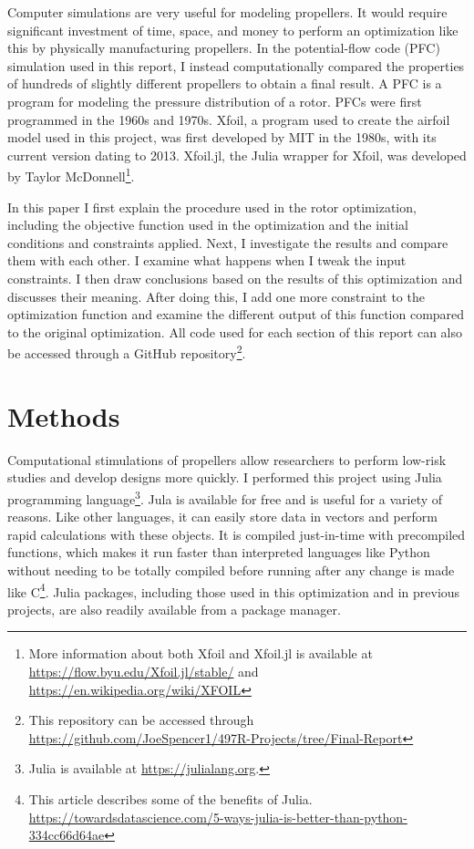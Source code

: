 \documentclass[journal ]{new-aiaa}
\begin{document}
Computer simulations are very useful for modeling propellers. It would require significant investment of time, space, and money to perform an optimization like this by physically manufacturing propellers. In the potential-flow code (PFC) simulation used in this report, I instead computationally compared the properties of hundreds of slightly different propellers to obtain a final result. A PFC is a program for modeling the pressure distribution of a rotor. PFCs were first programmed in the 1960s and 1970s. Xfoil, a program used to create the airfoil model used in this project, was first developed by MIT in the 1980s, with its current version dating to 2013. Xfoil.jl, the Julia wrapper for Xfoil, was developed by Taylor McDonnell\footnote{More information about both Xfoil and Xfoil.jl is available at \url{https://flow.byu.edu/Xfoil.jl/stable/} and \url{https://en.wikipedia.org/wiki/XFOIL}}.

In this paper I first explain the procedure used in the rotor optimization, including the objective function used in the optimization and the initial conditions and constraints applied. Next, I investigate the results and compare them with each other. I examine what happens when I tweak the input constraints. I then draw conclusions based on the results of this optimization and discusses their meaning. After doing this, I add one more constraint to the optimization function and examine the different output of this function compared to the original optimization. All code used for each section of this report can also be accessed through a GitHub repository\footnote{This repository can be accessed through \url{https://github.com/JoeSpencer1/497R-Projects/tree/Final-Report}}.


\section{Methods}

Computational stimulations of propellers allow researchers to perform low-risk studies and develop designs more quickly. I performed this project using Julia programming language\footnote{Julia is available at \url{https://julialang.org}.}. Jula is available for free and is useful for a variety of reasons. Like other languages, it can easily store data in vectors and perform rapid calculations with these objects. It is compiled just-in-time with precompiled functions, which makes it run faster than interpreted languages like Python without needing to be totally compiled before running after any change is made like C\footnote{This article describes some of the benefits of Julia. \url{https://towardsdatascience.com/5-ways-julia-is-better-than-python-334cc66d64ae}}. Julia  packages, including those used in this optimization and in previous projects, are also readily available from a package manager.
\end{document}
